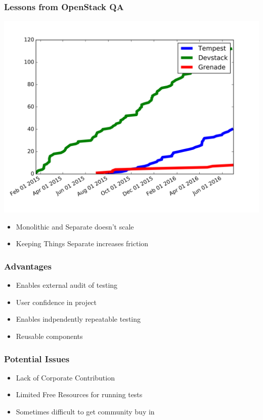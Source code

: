 \documentclass[aspectratio=43,11pt,hyperref={colorlinks=true}]{beamer}
\begin{document}
\begin{frame}
    \frametitle{Lessons from OpenStack QA}
    \begin{center}
        \includegraphics[width=.86\textwidth]{plugins.png}
    \end{center}
    \begin{itemize}
        \item Monolithic and Separate doesn't scale
        \item Keeping Things Separate increases friction
    \end{itemize}
\end{frame}

\begin{frame}
    \frametitle{Advantages}
    \begin{itemize}
        \item Enables external audit of testing
        \item User confidence in project
        \item Enables indpendently repeatable testing
        \item Reusable components
    \end{itemize}
\end{frame}

\begin{frame}
    \frametitle{Potential Issues}
    \begin{itemize}
        \item Lack of Corporate Contribution
        \item Limited Free Resources for running tests
        \item Sometimes difficult to get community buy in
    \end{itemize}
\end{frame}
\end{document}
